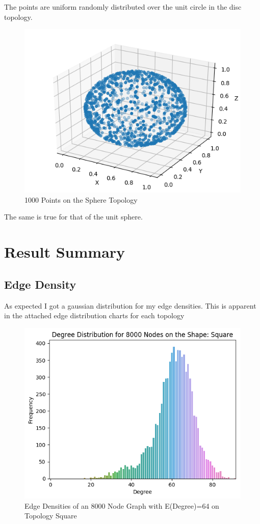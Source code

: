 \documentclass{article}
\begin{document}
    The points are uniform randomly distributed over the unit circle in the disc topology.
    \begin{figure}[H]

      \includegraphics[width=1 \textwidth]{sphere/drawing/sphere_drawing.png}
      \caption{1000 Points on the Sphere Topology}
    \end{figure}
    The same is true for that of the unit sphere.

\section{Result Summary}
  \subsection{Edge Density}
  As expected I got a gaussian distribution for my edge densities.
  This is apparent in the attached edge distribution charts for each topology
  \begin{figure}[H]

    \includegraphics[width=1 \textwidth]{square/edge_density/8000_64.png}
    \caption{Edge Densities of an 8000 Node Graph with E(Degree)=64 on Topology Square}
  \end{figure}
\end{document}
